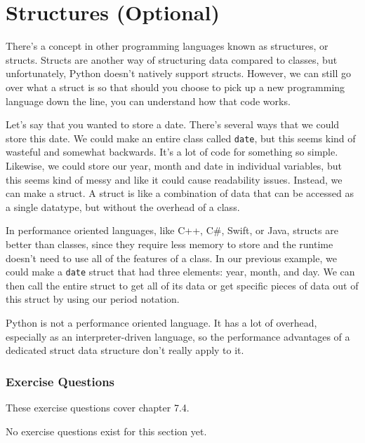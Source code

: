 \section{Structures (Optional)}
There's a concept in other programming languages known as structures, or structs. Structs are another way of structuring data compared to classes, but unfortunately, Python doesn't natively support structs. However, we can still go over what a struct is so that should you choose to pick up a new programming language down the line, you can understand how that code works.\par
Let's say that you wanted to store a date. There's several ways that we could store this date. We could make an entire class called \verb|date|, but this seems kind of wasteful and somewhat backwards. It's a lot of code for something so simple. Likewise, we could store our year, month and date in individual variables, but this seems kind of messy and like it could cause readability issues. Instead, we can make a struct. A struct is like a combination of data that can be accessed as a single datatype, but without the overhead of a class.\par
In performance oriented languages, like C++, C\#, Swift, or Java, structs are better than classes, since they require less memory to store and the runtime doesn't need to use all of the features of a class. In our previous example, we could make a \verb|date| struct that had three elements: year, month, and day. We can then call the entire struct to get all of its data or get specific pieces of data out of this struct by using our period notation.\par
Python is not a performance oriented language. It has a lot of overhead, especially as an interpreter-driven language, so the performance advantages of a dedicated struct data structure don't really apply to it.\par
\subsubsection*{Exercise Questions}
These exercise questions cover chapter 7.4.

No exercise questions exist for this section yet.